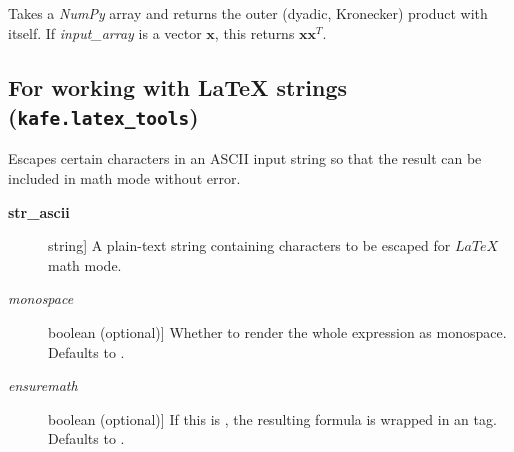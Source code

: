 \documentclass[a4paper,10pt,english]{sphinxmanual}
\begin{document}

\begin{fulllineitems}
\label{module_doc:kafe.function_tools.outer_product}
Takes a \emph{NumPy} array and returns the outer (dyadic, Kronecker) product
with itself. If \emph{input\_array} is a vector \(\mathbf{x}\), this returns
\(\mathbf{x}\mathbf{x}^T\).

\end{fulllineitems}



\subsection{For working with LaTeX strings (\texttt{kafe.latex\_tools})}
\label{module_doc:for-working-with-latex-strings-kafe-latex-tools}\label{module_doc:module-kafe.latex_tools}\label{module_doc:module-latex_tools}

\begin{fulllineitems}
\label{module_doc:kafe.latex_tools.ascii_to_latex_math}
Escapes certain characters in an ASCII input string so that the result
can be included in math mode without error.
\begin{description}
\item[{\textbf{str\_ascii}}] \leavevmode{[}string{]}
A plain-text string containing characters to be escaped for
\(LaTeX\) math mode.

\item[{\emph{monospace}}] \leavevmode{[}boolean (optional){]}
Whether to render the whole expression as monospace. Defaults to
.

\item[{\emph{ensuremath}}] \leavevmode{[}boolean (optional){]}
If this is , the resulting formula is wrapped in
an  tag. Defaults to .

\end{description}

\end{fulllineitems}
\end{document}
